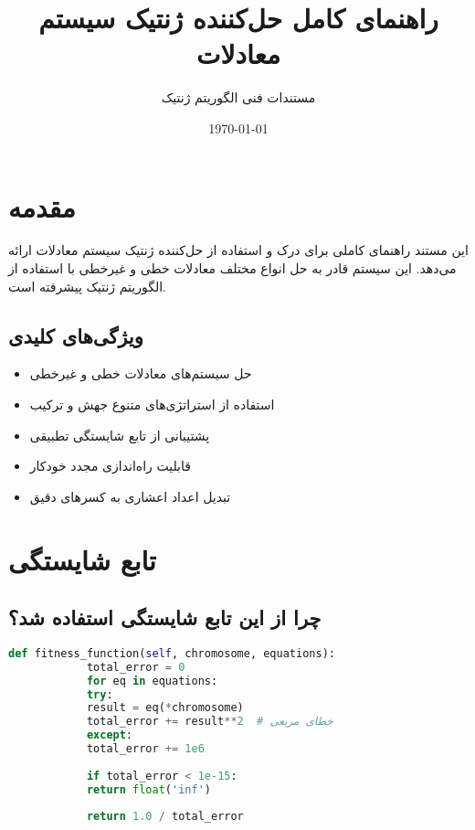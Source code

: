 \documentclass[12pt,a4paper]{article}
\title{\Huge\bfseries راهنمای کامل حل‌کننده ژنتیک سیستم معادلات\\
	\vspace{0.5cm}
	\Large\lr{Complete Guide to Genetic Algorithm Equation Solver}}
\author{مستندات فنی الگوریتم ژنتیک}
\date{\today}
\newenvironment{ltrcode}{\lr\bgroup}{\egroup}
\begin{document}
	
	\maketitle
	
	\tableofcontents
	\newpage
	
	\section{مقدمه}
	
	این مستند راهنمای کاملی برای درک و استفاده از حل‌کننده ژنتیک سیستم معادلات ارائه می‌دهد. این سیستم قادر به حل انواع مختلف معادلات خطی و غیرخطی با استفاده از الگوریتم ژنتیک پیشرفته است.
	
	\subsection{ویژگی‌های کلیدی}
	\begin{itemize}
		\item حل سیستم‌های معادلات خطی و غیرخطی
		\item استفاده از استراتژی‌های متنوع جهش و ترکیب
		\item پشتیبانی از تابع شایستگی تطبیقی
		\item قابلیت راه‌اندازی مجدد خودکار
		\item تبدیل اعداد اعشاری به کسرهای دقیق
	\end{itemize}
	
	\section{تابع شایستگی}
	
	\subsection{چرا از این تابع شایستگی استفاده شد؟}
	
	\begin{ltrcode}
		\begin{lstlisting}[language=Python, caption=تابع شایستگی اصلی]
			def fitness_function(self, chromosome, equations):
			total_error = 0
			for eq in equations:
			try:
			result = eq(*chromosome)
			total_error += result**2  # خطای مربعی
			except:
			total_error += 1e6
			
			if total_error < 1e-15:
			return float('inf')
			
			return 1.0 / total_error
		\end{lstlisting}
	\end{ltrcode}
	
\end{document}
